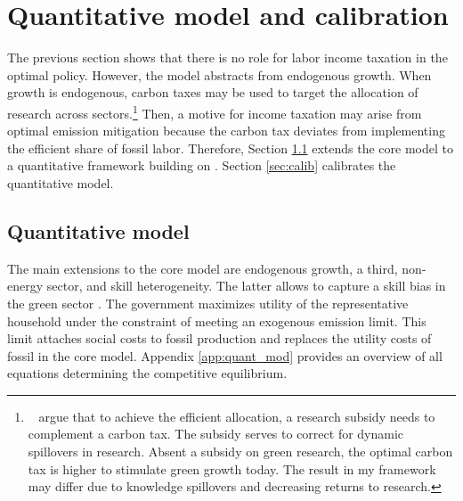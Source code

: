 \section{Quantitative model and calibration}\label{sec:model}

The previous section shows that there is no role for labor income taxation in the optimal policy. However, the model abstracts from endogenous growth. When growth is endogenous, carbon taxes may be used to target the allocation of research across sectors.\footnote{\ \cite{Acemoglu2012TheChange} argue that to achieve the efficient allocation, a research subsidy needs to complement a carbon tax. The subsidy serves to correct for dynamic spillovers in research. Absent a subsidy on green research, the optimal carbon tax is higher to stimulate green growth today. The result in my framework may differ due to knowledge spillovers and decreasing returns to research. } Then, a motive for income taxation may arise from optimal emission mitigation because the carbon tax deviates from implementing the efficient share of fossil labor. 
Therefore, Section \ref{sec_quantmod} extends the core model to a quantitative framework building on \cite{Fried2018ClimateAnalysis}. Section \ref{sec:calib} calibrates the quantitative model. 

\subsection{Quantitative model}\label{sec_quantmod}


The main extensions to the core model are endogenous growth, a third, non-energy sector, and skill heterogeneity. The latter allows to capture a skill bias in the green sector \citep{Consoli2016DoCapital}. 
The government maximizes utility of the representative household under the constraint of meeting an exogenous emission limit. This limit attaches social costs to fossil production and replaces the utility costs of fossil in the core model. 
Appendix \ref{app:quant_mod} provides an overview of all equations determining the competitive equilibrium.

